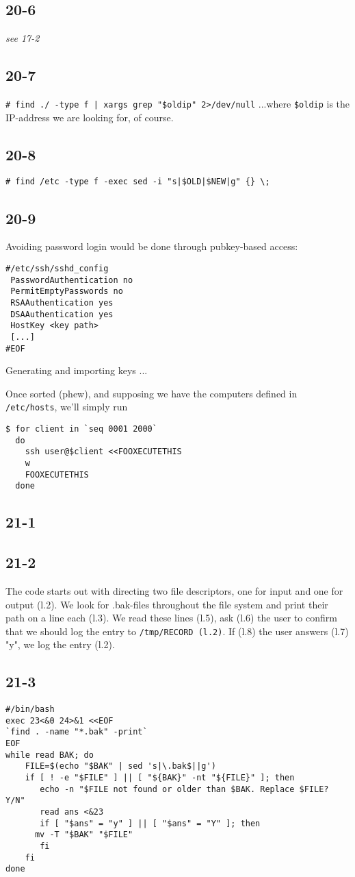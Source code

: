 \subsection{20-6}
\emph{see 17-2}

\subsection{20-7}
\verb=# find ./ -type f | xargs grep "$oldip" 2>/dev/null=
...where \verb=$oldip= is the IP-address we are looking for, of course.

\subsection{20-8}
\verb=# find /etc -type f -exec sed -i "s|$OLD|$NEW|g" {} \;=

\subsection{20-9}
Avoiding password login would be done through pubkey-based access:

\begin{verbatim}
#/etc/ssh/sshd_config
 PasswordAuthentication no
 PermitEmptyPasswords no
 RSAAuthentication yes
 DSAAuthentication yes
 HostKey <key path>
 [...]
#EOF
\end{verbatim}

Generating and importing keys ...

Once sorted (phew), and supposing we have the computers defined in \verb=/etc/hosts=,  we'll simply run

\begin{verbatim}
$ for client in `seq 0001 2000`
  do
    ssh user@$client <<FOOXECUTETHIS
    w
    FOOXECUTETHIS
  done
\end{verbatim}
\subsection{21-1}

\subsection{21-2}
The code starts out with directing two file descriptors, one for input and one for output (l.2). We look for .bak-files throughout the file system and print their path on a line each (l.3). We read these lines (l.5), ask (l.6) the user to confirm that we should log the entry to \verb=/tmp/RECORD (l.2)=. If (l.8) the user answers (l.7) "y", we log the entry (l.2).

\subsection{21-3}
\begin{verbatim}
#/bin/bash
exec 23<&0 24>&1 <<EOF
`find . -name "*.bak" -print`
EOF
while read BAK; do
    FILE=$(echo "$BAK" | sed 's|\.bak$||g')
    if [ ! -e "$FILE" ] || [ "${BAK}" -nt "${FILE}" ]; then
       echo -n "$FILE not found or older than $BAK. Replace $FILE? Y/N"
       read ans <&23
       if [ "$ans" = "y" ] || [ "$ans" = "Y" ]; then
	  mv -T "$BAK" "$FILE"
       fi
    fi
done
\end{verbatim}
